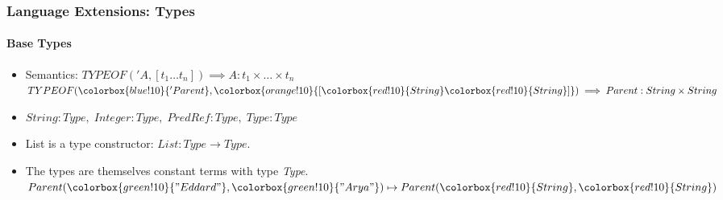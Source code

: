 \documentclass{beamer}
\newcommand{\strconst}[1]{ \colorbox{green!10}{#1} }
\newcommand{\predconst}[1]{ \colorbox{blue!10}{#1} }
\newcommand{\listconst}[1]{ \colorbox{orange!10}{#1} }
\newcommand{\typeconst}[1]{ \colorbox{red!10}{#1} }
\begin{document}
\begin{frame}
\frametitle{Language Extensions: Types}
\framesubtitle{Base Types}
\begin{itemize}
\item<2-> Semantics:  $TYPEOF('A, [t_1  \ldots  t_n]) \implies A : t_1 \times \ldots \times t_n$
 \footnotesize $TYPEOF(\predconst{'Parent}, \listconst{[\typeconst{String} \typeconst{String}]}) \implies Parent : String \times String$
\item<3-> $String : Type, \; Integer : Type, \; PredRef : Type, \; Type : Type$
\item<4-> List is a type constructor: $List : Type \rightarrow Type$.\\
\item<5-> The types are themselves constant terms with type \textit{Type}. 
\\
 {
	\vspace*{0.5cm}
	\hspace*{0.2cm}
	$Parent(\strconst{"Eddard"}, \strconst{"Arya"}) \mapsto Parent(\typeconst{String}, \typeconst{String})$
}
\end{itemize}
\end{frame}
\end{document}
